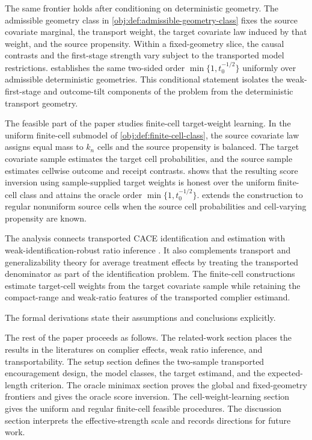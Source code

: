 \documentclass[11pt]{article}
\begin{document}
The same frontier holds after conditioning on deterministic geometry. The admissible geometry class in \cref{obj:def:admissible-geometry-class} fixes the source covariate marginal, the transport weight, the target covariate law induced by that weight, and the source propensity. Within a fixed-geometry slice, the causal contrasts and the first-stage strength vary subject to the transported model restrictions.  establishes the same two-sided order \(\min\{1,t_0^{-1/2}\}\) uniformly over admissible deterministic geometries. This conditional statement isolates the weak-first-stage and outcome-tilt components of the problem from the deterministic transport geometry.

The feasible part of the paper studies finite-cell target-weight learning. In the uniform finite-cell submodel of \cref{obj:def:finite-cell-class}, the source covariate law assigns equal mass to \(k_n\) cells and the source propensity is balanced. The target covariate sample estimates the target cell probabilities, and the source sample estimates cellwise outcome and receipt contrasts.  shows that the resulting score inversion using sample-supplied target weights is honest over the uniform finite-cell class and attains the oracle order \(\min\{1,t_0^{-1/2}\}\).  extends the construction to regular nonuniform source cells when the source cell probabilities and cell-varying propensity are known.

The analysis connects transported CACE identification and estimation \citep{RudolphVanderLaan2017,ChenHuang2025} with weak-identification-robust ratio inference \citep{GleserHwang1987,Dufour1997,ChoiGuShen2018,ChoiShen2019,Ma2023,SmuclerLanniMasip2025}. It also complements transport and generalizability theory for average treatment effects \citep{HotzImbensMortimer2005,PearlBareinboim2011,BareinboimPearl2013,BareinboimPearl2016,DahabrehPetitoRobertson2020,Nguyen2017,ZengKennedyBodnarNaimi2024} by treating the transported denominator as part of the identification problem. The finite-cell constructions estimate target-cell weights from the target covariate sample while retaining the compact-range and weak-ratio features of the transported complier estimand.

The formal derivations state their assumptions and conclusions explicitly.

The rest of the paper proceeds as follows. The related-work section places the results in the literatures on complier effects, weak ratio inference, and transportability. The setup section defines the two-sample transported encouragement design, the model classes, the target estimand, and the expected-length criterion. The oracle minimax section proves the global and fixed-geometry frontiers and gives the oracle score inversion. The cell-weight-learning section gives the uniform and regular finite-cell feasible procedures. The discussion section interprets the effective-strength scale and records directions for future work.
\end{document}
